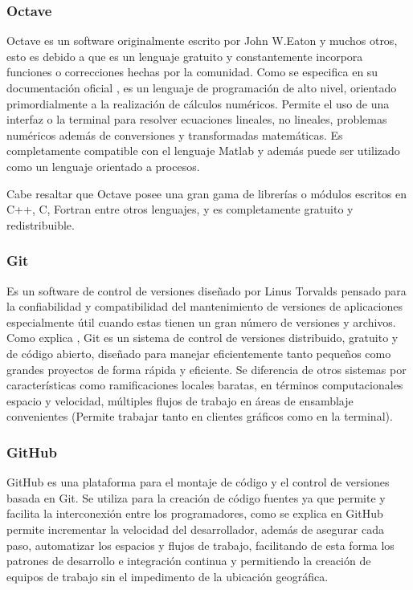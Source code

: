 \subsubsection{Octave}
Octave es un software originalmente escrito por John W.Eaton y muchos otros,
esto es debido a que es un lenguaje gratuito y constantemente incorpora
funciones o correcciones hechas por la comunidad. Como se especifica en su
documentación oficial \textcite{octave}, es un lenguaje de programación de alto
nivel, orientado primordialmente a la realización de cálculos numéricos.
Permite el uso de una interfaz  o la terminal para resolver ecuaciones
lineales, no lineales, problemas numéricos además de conversiones y
transformadas matemáticas. Es completamente compatible con el lenguaje Matlab y
además puede ser utilizado como un lenguaje orientado a procesos.

Cabe resaltar que Octave posee una gran gama de librerías o módulos escritos en
C++, C, Fortran entre otros lenguajes, y es completamente gratuito y
redistribuible.


\subsubsection{Git}
Es un software de control de versiones diseñado por Linus Torvalds pensado para
la confiabilidad y compatibilidad del mantenimiento de versiones de aplicaciones
especialmente útil cuando estas tienen un gran número de versiones y archivos.
Como explica \textcite{Git}, Git es un sistema de control de versiones distribuido,
gratuito y de código abierto, diseñado para manejar eficientemente tanto pequeños
como grandes proyectos de forma rápida y eficiente. Se diferencia de otros sistemas
por características como ramificaciones locales baratas, en términos computacionales
espacio y velocidad, múltiples flujos de trabajo en áreas de ensamblaje convenientes
(Permite trabajar tanto en clientes gráficos como en la terminal).

\subsubsection{GitHub}
GitHub es una plataforma para el montaje de  código y el control de versiones
basada en Git. Se utiliza para la creación de código fuentes ya que permite y
facilita la interconexión entre los programadores, como se explica en \textcite{github}
 GitHub  permite incrementar la velocidad del desarrollador, además de asegurar
cada paso, automatizar los espacios y flujos de trabajo, facilitando de esta
forma los patrones de desarrollo e integración continua y permitiendo la creación
de equipos de trabajo sin el impedimento de la ubicación geográfica.

